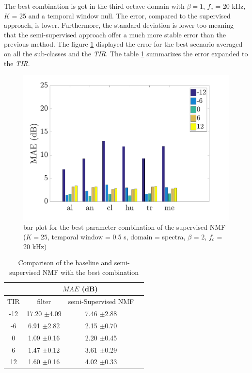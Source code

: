 \documentclass[twocolumn,a4paper,10pt]{article}
\begin{document}
The best combination is got in the third octave domain with $\beta = 1$, $f_c$ = 20 kHz, $K$ = 25 and a temporal window null. The error, compared to the supervised approach, is lower. Furthermore, the standard deviation is lower too meaning that the semi-supervised approach offer a much more stable error than the previous method. The figure \ref{fig:nmfSemiSupervisedAmbiance} displayed the error for the best scenario averaged on all the sub-classes and the \textit{TIR}. The table \ref{tab:comparisonFilterSemiSupervised} summarizes the error expanded to the \textit{TIR}.

\begin{figure}[hbtp]
\centering
\includegraphics[width=\linewidth]{../image/AmbianceNmfSemiSupervised.pdf}
\caption{bar plot for the best parameter combination of the supervised NMF ($K = 25$, temporal window = 0.5 s, domain = spectra, $\beta$ = 2, $f_c$ = 20 kHz)}
\label{fig:nmfSemiSupervisedAmbiance}
\end{figure}

\begin{table}
\centering
\begin{tabular}{cccc}
    & \multicolumn{2}{c}{$MAE$ (dB)} \\ \hline
TIR & filter & semi-Supervised NMF \\ \hline
 -12 & 17.20 $\pm$4.09 &  7.46 $\pm$2.88 \\
 -6 &  6.91 $\pm$2.82 & 2.15 $\pm$0.70\\
 0 & 1.09 $\pm$0.16 &  2.20 $\pm$0.45\\
 6 &  1.47 $\pm$0.12 &  3.61 $\pm$0.29\\
 12 &  1.60 $\pm$0.16 &  4.02 $\pm$0.33\\
\end{tabular}
\caption{Comparison of the baseline and semi-supervised NMF with the best combination}
\label{tab:comparisonFilterSemiSupervised}
\end{table}
\end{document}
